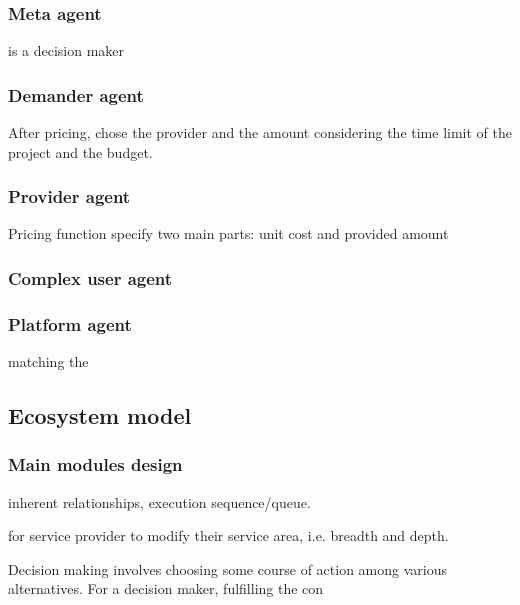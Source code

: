 \subsubsection{Meta agent} %
\label{ssub:meta_agent}
is a decision maker

\subsubsection{Demander agent} %
\label{ssub:demander_agent}
After pricing, chose the provider and the amount considering the time limit of the project and the budget.

\subsubsection{Provider agent} %
\label{ssub:provider_agent}
Pricing function specify two main parts:
unit cost and
provided amount

\subsubsection{Complex user agent} %
\label{ssub:complex_user_agent}


\subsubsection{Platform agent} %
\label{ssub:platform_agent}
matching the 


\subsection{Ecosystem model} %
\label{sub:ecosystem model}


\subsubsection{Main modules design}
\label{subsub:main_modules}
inherent relationships, execution sequence/queue.

for service provider to modify their service area, i.e. breadth and depth.

Decision making involves choosing some course of action among various alternatives. For a decision maker, fulfilling the con


